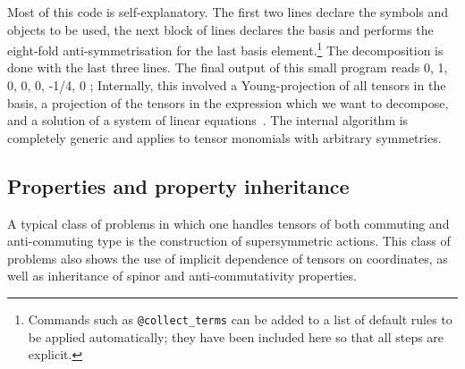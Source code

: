 \documentclass{elsart}
\newenvironment{screen}{\vspace{1ex}\Verbatim}{\endVerbatim\vspace{1ex}}
\begin{document}
Most of this code is self-explanatory. The first two lines declare the
  symbols and objects to be used, the next block of lines declares the
  basis and performs the eight-fold anti-symmetrisation for the last
  basis element.\footnote{Commands such as {\tt @collect\_terms} can
  be added to a list of default rules to be applied automatically;
  they have been included here so that all steps are explicit.}
  The decomposition is done with the last three lines. The
  final output of this small program reads
\begin{screen}
{0, 1, 0, 0, 0, -1/4, 0 };
\end{screen}
Internally, this involved a Young-projection of all tensors in the
basis, a projection of the tensors in the expression which we want to
decompose, and a solution of a system of linear
equations~\cite{Green:2005qr}. The internal algorithm is completely
generic and applies to tensor monomials with arbitrary symmetries.

\subsection{Properties and property inheritance}

A typical class of problems in which one handles tensors of both
commuting and anti-commuting type is the construction of
supersymmetric actions. This class of problems also shows the use of
implicit dependence of tensors on coordinates, as well as inheritance
of spinor and anti-commutativity properties. 
\end{document}
